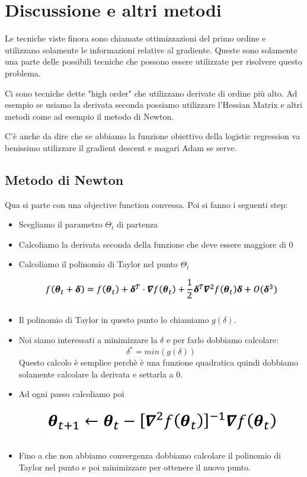 \documentclass[14pt]{extreport}
\begin{document}
\section{Discussione e altri metodi}

Le tecniche viste finora sono chiamate ottimizzazioni del primo ordine e utilizzano solamente le informazioni relative al gradiente. Queste sono
solamente una parte delle possibili tecniche che possono essere utilizzate per risolvere questo problema.

Ci sono tecniche dette "high order" che utilizzano derivate di ordine più alto. Ad esempio se usiamo la derivata seconda possiamo utilizzare l'Hessian
Matrix e altri metodi come ad esempio il metodo di Newton.

C'è anche da dire che se abbiamo la funzione obiettivo della logistic regression va benissimo utilizzare il gradient descent e magari Adam se serve.

\subsection{Metodo di Newton}

Qua si parte con una objective function convessa. Poi si fanno i seguenti step:

\begin{itemize}
\item Scegliamo il parametro $\Theta_t$ di partenza
\item Calcoliamo la derivata seconda della funzione che deve essere maggiore di 0 
\item Calcoliamo il polinomio di Taylor nel punto $\Theta_t$ \begin{figure}[H]
\centering
\includegraphics[width=0.7\linewidth]{256.jpeg}
\end{figure}
\item Il polinomio di Taylor in questo punto lo chiamiamo $g(\delta)$. 
\item Noi siamo interessati a minimizzare la $\delta$ e per farlo dobbiamo calcolare: $$\delta^* = min(g(\delta))$$ Questo calcolo è semplice perchè è
una funzione quadratica quindi dobbiamo solamente calcolare la derivata e settarla a 0.
\item Ad ogni passo calcoliamo poi \begin{figure}[H]
\centering
\includegraphics[width=0.7\linewidth]{257.jpeg}
\end{figure}
\item Fino a che non abbiamo convergenza dobbiamo calcolare il polinomio di Taylor nel punto e poi minimizzare per ottenere il nuovo punto.
\end{itemize}
\end{document}
